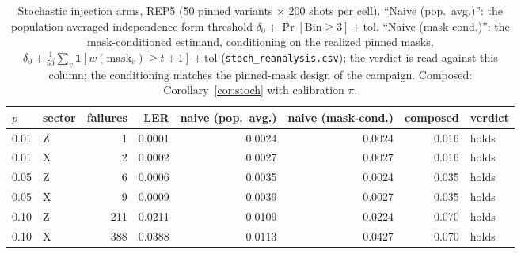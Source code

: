 \documentclass[pdflatex,sn-mathphys-num]{sn-jnl}
\theoremstyle{thmstyleone}
\theoremstyle{thmstyletwo}
\theoremstyle{thmstylethree}
\begin{document}
\begin{table}[htbp]\centering\small
\caption{Stochastic injection arms, REP5 (50 pinned variants $\times$ 200 shots per cell). ``Naive (pop.\ avg.)'': the population-averaged independence-form threshold $\delta_0+\Pr[\mathrm{Bin}\ge3]+\mathrm{tol}$. ``Naive (mask-cond.)'': the mask-conditioned estimand, conditioning on the realized pinned masks, $\delta_0+\frac{1}{50}\sum_v\mathbf{1}[w(\mathrm{mask}_v)\ge t{+}1]+\mathrm{tol}$ (\texttt{stoch\_reanalysis.csv}); the verdict is read against this column; the conditioning matches the pinned-mask design of the campaign. Composed: Corollary~\ref{cor:stoch} with calibration $\pi$.}
\label{tab:injstoch}
{\setlength{\tabcolsep}{2.5pt}
\begin{tabular}{@{}llrrrrrl@{}}
\toprule
$p$ & sector & failures & LER & naive (pop.\ avg.) & naive
(mask-cond.) & composed & verdict \\\midrule
0.01 & Z & 1 & 0.0001 & 0.0024 & 0.0024 & 0.016 & holds \\
0.01 & X & 2 & 0.0002 & 0.0027 & 0.0027 & 0.016 & holds \\
0.05 & Z & 6 & 0.0006 & 0.0035 & 0.0024 & 0.035 & holds \\
0.05 & X & 9 & 0.0009 & 0.0039 & 0.0027 & 0.035 & holds \\
0.10 & Z & 211 & 0.0211 & 0.0109 & 0.0224 & 0.070 & holds \\
0.10 & X & 388 & 0.0388 & 0.0113 & 0.0427 & 0.070 & holds \\\bottomrule
\end{tabular}}
\end{table}
\end{document}
